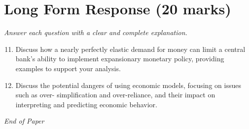 \documentclass[12pt]{article}
\begin{document}
\section*{Long Form Response (20 marks)}
\textit{Answer each question with a clear and complete explanation.}
\begin{enumerate}[label=\arabic*.]
\setcounter{enumi}{10}
\item Discuss how a nearly perfectly elastic demand for money can limit a central bank's ability to implement expansionary monetary policy, providing examples to support your analysis.
\item Discuss the potential dangers of using economic models, focusing on issues such as over- simplification and over-reliance, and their impact on interpreting and predicting economic behavior.
\end{enumerate}

\vfill
\noindent\textit{End of Paper}
\end{document}
